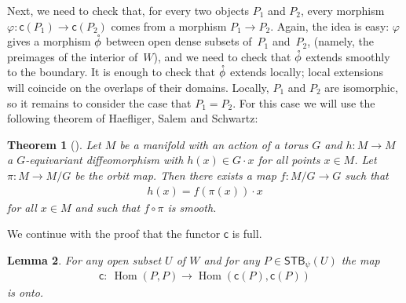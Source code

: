 \documentclass[10pt,a4paper]{amsart}
\numberwithin{equation}{section}
\newtheorem{Lemma}{Lemma}[section]
\newtheorem{Theorem}[Lemma]{Theorem}
\begin{document}
Next, we need to check that, for every two objects $P_1$ and $P_2$,
every morphism $\varphi \colon {\textsf{c}}(P_1) \to {\textsf{c}}(P_2)$
comes from a morphism $P_1 \to P_2$.
Again, the idea is easy: $\varphi$ gives a morphism ${\mathaccent23{\phi}}$
between open dense subsets of~$P_1$ and~$P_2$,
(namely, the preimages of the interior of~$W$),
and we need to check that ${\mathaccent23{\phi}}$ extends smoothly to the boundary.
It is enough to check that ${\mathaccent23{\phi}}$ extends locally;
local extensions will coincide on the overlaps of their domains.
Locally, $P_1$ and $P_2$ are isomorphic, so it remains to consider the
case that $P_1 = P_2$.  For this case we will use
the following theorem of Haef\/liger, Salem and Schwartz:

\begin{Theorem}[] \label{thm:HSS}
Let
  $M$ be a manifold with an action of a torus $G$ and $h\colon M\to M$ a
  $G$-equivariant diffeomorphism with $h(x)\in G\cdot x$ for all
  points $x\in M$. Let $\pi\colon  M \to M/G$ be the orbit map.
  Then there exists a map $f\colon M/G\to G$ such that
\begin{gather*}
h(x) = f(\pi (x))\cdot x
\end{gather*}
for all $x\in M$ and such that $f \circ \pi$ is smooth.
\end{Theorem}

We continue with the proof that the functor ${\textsf{c}}$ is full.

\begin{Lemma} \label{lem4:2}
For any open subset $U$ of $W$ and for any $P\in {\textsf{STB}}_\psi(U)$ the map
\begin{gather*}
{\textsf{c}}\colon \ \operatorname{Hom}(P,P)\to \operatorname{Hom} ({\textsf{c}}(P), {\textsf{c}}(P))
\end{gather*}
is onto.
\end{Lemma}
\end{document}
